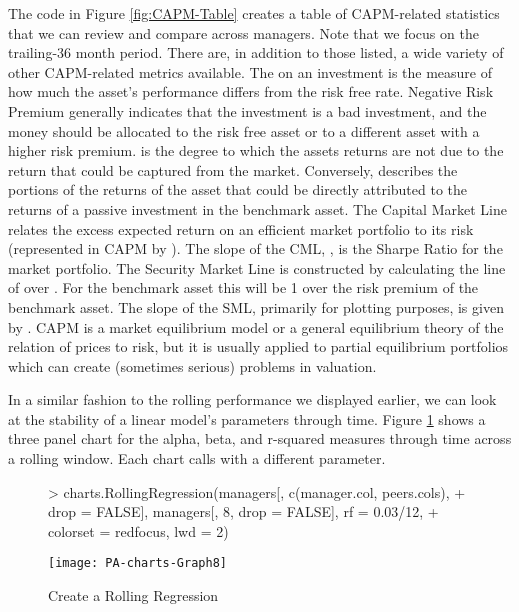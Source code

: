 \documentclass[12pt,letterpaper,english]{article}
\begin{document}
The code in Figure \ref{fig:CAPM-Table} creates a table of CAPM-related
statistics that we can review and compare across managers. Note that
we focus on the trailing-36 month period. There are, in addition to
those listed, a wide variety of other CAPM-related metrics available.
The  on an investment is the measure
of how much the asset's performance differs from the risk free rate.
Negative Risk Premium generally indicates that the investment is a
bad investment, and the money should be allocated to the risk free
asset or to a different asset with a higher risk premium. 
is the degree to which the assets returns are not due to the return
that could be captured from the market. Conversely, 
describes the portions of the returns of the asset that could be directly
attributed to the returns of a passive investment in the benchmark
asset. The Capital Market Line  relates
the excess expected return on an efficient market portfolio to its
risk (represented in CAPM by ). The slope
of the CML, , is the Sharpe Ratio
for the market portfolio. The Security Market Line is constructed
by calculating the line of  over
. For the benchmark asset this will be
1 over the risk premium of the benchmark asset. The slope of the SML,
primarily for plotting purposes, is given by .
CAPM is a market equilibrium model or a general equilibrium theory
of the relation of prices to risk, but it is usually applied to partial
equilibrium portfolios which can create (sometimes serious) problems
in valuation.


In a similar fashion to the rolling performance we displayed earlier,
we can look at the stability of a linear model's parameters through
time. Figure \ref{fig:Rolling-Regression} shows a three panel chart
for the alpha, beta, and r-squared measures through time across a
rolling window. Each chart calls 
with a different  parameter.

%
\begin{figure}

\caption{Create a Rolling Regression}

\label{fig:Rolling-Regression}

\begin{center}

\begin{Schunk}
\begin{Sinput}
> charts.RollingRegression(managers[, c(manager.col, peers.cols), 
+     drop = FALSE], managers[, 8, drop = FALSE], rf = 0.03/12, 
+     colorset = redfocus, lwd = 2)
\end{Sinput}
\end{Schunk}
\texttt{[image: PA-charts-Graph8]}

\end{center}
\end{figure}
\end{document}
